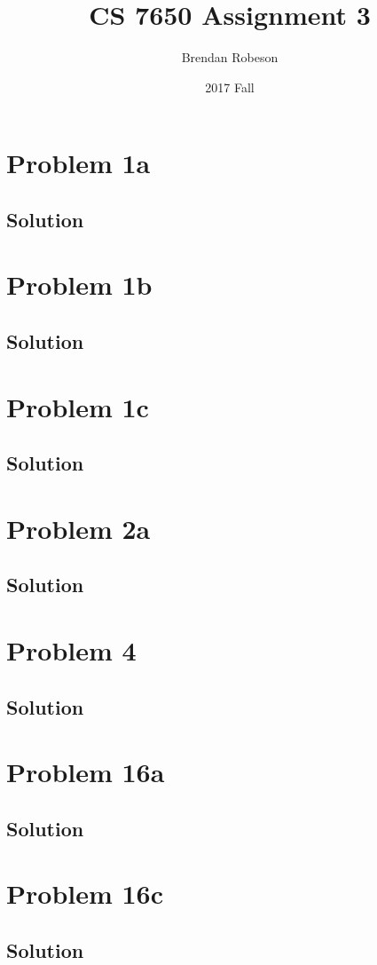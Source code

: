 \documentclass{IEEEtran}
\title{CS 7650 Assignment 3}
\author{Brendan Robeson}
\date{2017 Fall}
\begin{document}
\maketitle

\section{Problem 1a}
\subsection{Solution}

\newpage

\section{Problem 1b}
\subsection{Solution}

\newpage

\section{Problem 1c}
\subsection{Solution}

\newpage

\section{Problem 2a}
\subsection{Solution}

\newpage

\section{Problem 4}
\subsection{Solution}

\newpage

\section{Problem 16a}
\subsection{Solution}

\newpage

\section{Problem 16c}
\subsection{Solution}
\end{document}
